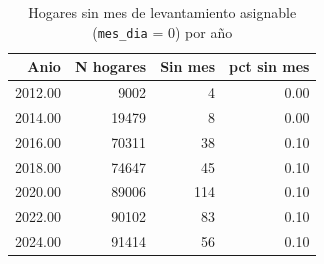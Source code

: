 \begin{table}[ht]
\centering
\caption{Hogares sin mes de levantamiento asignable (\texttt{mes\_dia} = 0) por a\~{n}o} 
\label{tab:07a_cobertura_mes}
\begin{tabular}{rrrr}
  \toprule
Anio & N hogares & Sin mes & pct sin mes \\ 
  \midrule
2012.00 & 9002 &   4 & 0.00 \\ 
  2014.00 & 19479 &   8 & 0.00 \\ 
  2016.00 & 70311 &  38 & 0.10 \\ 
  2018.00 & 74647 &  45 & 0.10 \\ 
  2020.00 & 89006 & 114 & 0.10 \\ 
  2022.00 & 90102 &  83 & 0.10 \\ 
  2024.00 & 91414 &  56 & 0.10 \\ 
   \bottomrule
\end{tabular}
\end{table}
